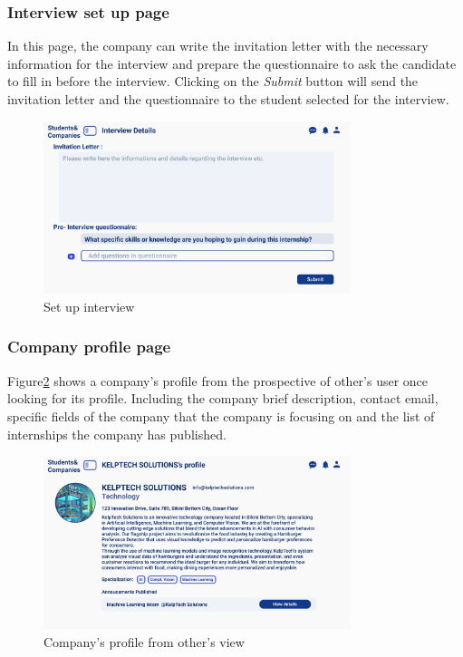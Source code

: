 \subsubsection{Interview set up page}
In this page, the company can write the invitation letter with the necessary information for the interview and prepare
the questionnaire to ask the candidate to fill in before the interview. Clicking on the \textit{Submit} button will send 
the invitation letter and the questionnaire to the student selected for the interview.
\begin{figure}[H]
    \centering
    \includegraphics[width=0.8\textwidth]{Images/UI/Set Interview-Company.png}
    \caption{Set up interview}\label{fig:Set up interview}
\end{figure}

\subsubsection{Company profile page}
Figure\ref{fig:Company's profile from other's view} shows a company's profile from the 
prospective of other's user once looking for its profile.
Including the company brief description, contact email, specific fields of the company that 
the company is focusing on and the list of internships the company has published.
\begin{figure}[H]
    \centering
    \includegraphics[width=0.8\textwidth]{Images/UI/Company profile.png}
    \caption{Company's profile from other's view}\label{fig:Company's profile from other's view}
\end{figure}


